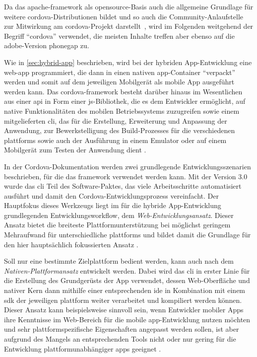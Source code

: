 Da das \gls{apache}-\gls{framework} als \gls{opensource}-Basis auch die allgemeine Grundlage für weitere \gls{cordova}-Distributionen bildet und so auch die Community-Anlaufstelle zur Mitwirkung am \gls{cordova}-Projekt darstellt~\cite{PhoneGap_Cordova_and_whats_in_a_name}, wird im Folgenden weitgehend der Begriff \enquote{\gls{cordova}} verwendet, die meisten Inhalte treffen aber ebenso auf die \gls{adobe}-Version \gls{phonegap} zu.


Wie in \autoref{sec:hybrid-app} beschrieben, wird bei der hybriden App-Entwicklung eine \gls{web-app} programmiert, die dann in einen nativen \gls{app}-Container \enquote{verpackt} werden und somit auf dem jeweiligen Mobilgerät als mobile App ausgeführt werden kann. 
Das \gls{cordova}-\gls{framework} besteht darüber hinaus im Wesentlichen aus einer \gls{api} in Form einer \gls{js}-Bibliothek, die es dem Entwickler ermöglicht, auf native Funktionalitäten des mobilen Betriebssystems zuzugreifen sowie einem mitgelieferten \gls{cli}, das für die Erstellung, Erweiterung und Anpassung der Anwendung, zur Bewerkstelligung des Build-Prozesses für die verschiedenen \glspl{plattform} sowie auch der Ausführung in einem Emulator oder auf einem Mobilgerät zum Testen der Anwendung dient \cite{Cordova-Docs_Overview}.


In der Cordova-Dokumentation werden zwei grundlegende Entwicklungsszenarien beschrieben, für die das \gls{framework} verwendet werden kann. 
Mit der Version 3.0 wurde das \gls{cli} Teil des Software-Paktes, das viele Arbeitsschritte automatisiert ausführt und damit den Cordova-Entwicklungsprozess vereinfacht. 
Der Hauptfokus dieses Werkzeugs liegt im für die hybride App-Entwicklung grundlegenden Entwicklungsworkflow, dem \emph{Web-Ent\-wick\-lungs\-an\-satz}.
Dieser Ansatz bietet die breiteste Plattformunterstützung bei möglichst geringem Mehraufwand für unterschiedliche \glspl{plattform} und bildet damit die Grundlage für den hier hauptsächlich fokussierten Ansatz \cite{Cordova-Docs_CLI}.

Soll nur eine bestimmte Zielplattform bedient werden, kann auch nach dem \emph{Nativen-Plattformansatz} entwickelt werden.
Dabei wird das \gls{cli} in erster Linie für die Erstellung des Grundgerüsts der App verwendet, dessen Web-Oberfläche und nativer Kern dann mithilfe einer entsprechenden \gls{ide} in Kombination mit einem \gls{sdk} der jeweiligen \gls{plattform} weiter verarbeitet und kompiliert werden können. 
Dieser Ansatz kann beispielsweise sinnvoll sein, wenn Entwickler mobiler Apps ihre Kenntnisse im Web-Bereich für die mobile \gls{app}-Entwicklung nutzen möchten und sehr plattformspezifische Eigenschaften angepasst werden sollen, ist aber aufgrund des Mangels an entsprechenden Tools nicht oder nur gering für die Entwicklung plattformunabhängiger \glspl{app} geeignet \cite{Cordova-Docs_CLI}. 

